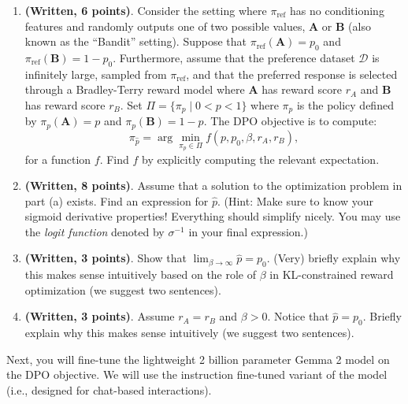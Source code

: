 \documentclass[
  letterpaper,
  numbers=noenddot,
  DIV=11,
  oneside]{scrreprt}
\theoremstyle{remark}
\DeclareRobustCommand{\href}[2]{#2\sidenote{\footnotesize \url{#1}}}
\begin{document}
\begin{enumerate}
\def\labelenumi{(\alph{enumi})}
\item
  \textbf{(Written, 6 points)}. Consider the setting where
  \(\pi_{\text{ref}}\) has no conditioning features and randomly outputs
  one of two possible values, \(\mathbf{A}\) or \(\mathbf{B}\) (also
  known as the ``Bandit'' setting). Suppose that
  \(\pi_{\text{ref}}(\mathbf{A})=p_0\) and
  \(\pi_{\text{ref}}(\mathbf{B})=1-p_0\). Furthermore, assume that the
  preference dataset \(\mathcal{D}\) is infinitely large, sampled from
  \(\pi_{\text{ref}}\), and that the preferred response is selected
  through a Bradley-Terry reward model where \(\mathbf{A}\) has reward
  score \(r_A\) and \(\mathbf{B}\) has reward score \(r_B\). Set
  \(\Pi=\{\pi_p\mid 0<p<1\}\) where \(\pi_p\) is the policy defined by
  \(\pi_p(\mathbf{A})=p\) and \(\pi_p(\mathbf{B})=1-p\). The DPO
  objective is to compute:
  \[\pi_{\hat{p}}=\arg \min_{\pi_p\in \Pi} f(p, p_0, \beta, r_A, r_B),\]
  for a function \(f\). Find \(f\) by explicitly computing the relevant
  expectation.
\item
  \textbf{(Written, 8 points)}. Assume that a solution to the
  optimization problem in part (a) exists. Find an expression for
  \(\hat{p}\). (Hint: Make sure to know your sigmoid derivative
  properties! Everything should simplify nicely. You may use the
  \href{https://en.wikipedia.org/wiki/Logit}{\emph{logit function}}
  denoted by \(\sigma^{-1}\) in your final expression.)
\item
  \textbf{(Written, 3 points)}. Show that
  \(\lim_{\beta\to\infty}\hat{p}=p_0.\) (Very) briefly explain why this
  makes sense intuitively based on the role of \(\beta\) in
  KL-constrained reward optimization (we suggest two sentences).
\item
  \textbf{(Written, 3 points)}. Assume \(r_A=r_B\) and \(\beta>0\).
  Notice that \(\hat{p}=p_0\). Briefly explain why this makes sense
  intuitively (we suggest two sentences).
\end{enumerate}

Next, you will fine-tune the lightweight 2 billion parameter Gemma 2
model on the DPO objective. We will use the instruction fine-tuned
variant of the model (i.e., designed for chat-based interactions).
\end{document}
